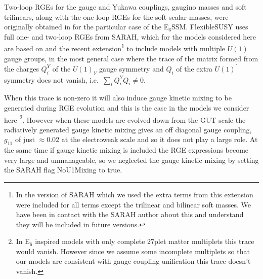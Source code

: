 \documentclass[preprint,amsmath,amssymb,aps,superscriptaddress,prd,showpacs,floatfix,nofootinbib]{revtex4-1}
\begin{document}
 Two-loop RGEs for the gauge and Yukawa couplings, gaugino masses and
 soft trilinears, along with the one-loop RGEs for the soft scalar
 masses, were originally obtained in \cite{Athron:2009bs} for the
 particular case of the E$_6$SSM.  FlexibleSUSY uses full one- and
 two-loop RGEs from SARAH, which for the models considered here are
 based on \cite{Martin:1993zk} and the recent extension\footnote{In
   the version of SARAH which we used the extra terms from this
   extension were included for all terms except the trilinear and
   bilinear soft masses. We have been in contact with the SARAH author
   about this and understand they will be included in future
   versions.}  \cite{Fonseca:2011vn} to include models with multiple
 $U(1)$ gauge groups, in the most general case where the trace of the
 matrix formed from the charges $Q^Y_i$ of the $U(1)_Y$ gauge symmetry
 and $Q_i$ of the extra $U(1)^\prime$ symmetry does not vanish,
 i.e.~$\sum_i Q_i^YQ_i \neq 0$.  

When this trace is non-zero it will also induce gauge kinetic mixing
to be generated during RGE evolution and this is the case in the
models we consider here \footnote{In E$_6$ inspired models with only
  complete $27$plet matter multiplets this trace would vanish.
  However since we assume some incomplete multiplets so that our
  models are consistent with gauge coupling unification this trace
  doesn't vanish.}. However when these models are evolved down from
the GUT scale the radiatively generated gauge kinetic mixing gives an
off diagonal gauge coupling, $g_{11}$ of just $\approx 0.02$ at the
electroweak scale \cite{King:2005jy} and so it does not play a large
role.  At the same time if gauge kinetic mixing is included the RGE
expressions become very large and unmanageable, so we neglected the
gauge kinetic mixing by setting the SARAH flag NoU1Mixing to true.
\end{document}
